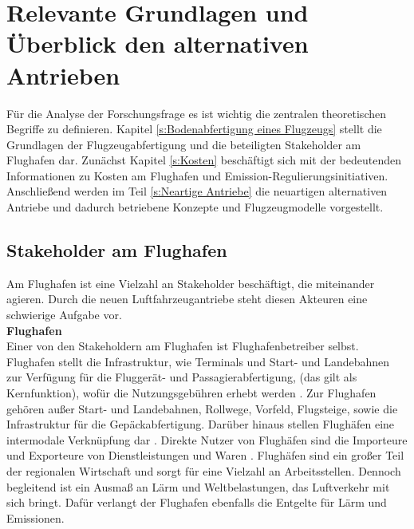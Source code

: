 \chapter{Relevante Grundlagen und Überblick den alternativen Antrieben}
\label{ch:Relevante Grundlagen und Überblick den alternativen Antrieben}
Für die Analyse der Forschungsfrage es ist wichtig die zentralen theoretischen Begriffe zu definieren. 
Kapitel \ref{s:Bodenabfertigung eines Flugzeugs} stellt die Grundlagen der Flugzeugabfertigung und 
die beteiligten Stakeholder am Flughafen dar. Zunächst Kapitel \ref{s:Kosten} beschäftigt sich
mit der bedeutenden Informationen zu Kosten am Flughafen und Emission-Regulierungsinitiativen. 
Anschließend werden im Teil \ref{s:Neartige Antriebe}
die neuartigen alternativen Antriebe und dadurch betriebene Konzepte und Flugzeugmodelle vorgestellt.

\section{Stakeholder am Flughafen}
\label{s:Stakeholder am Flughafen}

Am Flughafen ist eine Vielzahl an Stakeholder beschäftigt, die miteinander agieren. 
Durch die neuen Luftfahrzeugantriebe steht diesen Akteuren eine 
schwierige Aufgabe vor.\\
\textbf{Flughafen} \\
Einer von den Stakeholdern am Flughafen ist Flughafenbetreiber selbst. 
Flughafen stellt die Infrastruktur, wie Terminals und Start- und Landebahnen zur Verfügung für die Fluggerät- und Passagierabfertigung, 
(das gilt als Kernfunktion), wofür die Nutzungsgebühren erhebt werden \cite{conrady2019luftverkehr}. %
Zur Flughafen gehören außer Start- und Landebahnen, Rollwege, Vorfeld, Flugsteige, sowie die Infrastruktur für die Gepäckabfertigung. 
Darüber hinaus stellen Flughäfen eine intermodale Verknüpfung dar \cite{conrady2019luftverkehr}. %
Direkte Nutzer von Flughäfen sind die Importeure und Exporteure von Dienstleistungen und Waren \cite{schaar2010analysis}. 
Flughäfen sind ein großer Teil der regionalen Wirtschaft \cite{schaar2010analysis} und sorgt für eine Vielzahl an Arbeitsstellen. 
Dennoch begleitend ist ein Ausmaß an Lärm und Weltbelastungen, das Luftverkehr mit sich bringt.
Dafür verlangt der Flughafen ebenfalls die Entgelte für Lärm und Emissionen. \\ %

